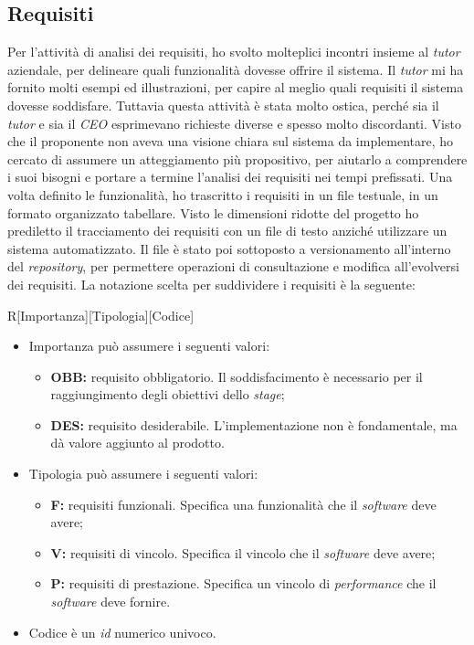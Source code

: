\subsection{Requisiti}
Per l'attività di analisi dei requisiti, ho svolto molteplici incontri insieme al \emph{tutor} aziendale, per delineare quali funzionalità dovesse offrire il sistema. Il \emph{tutor} mi ha fornito molti esempi ed illustrazioni, per capire al meglio quali requisiti il sistema dovesse soddisfare. Tuttavia questa attività è stata molto ostica, perché sia il \emph{tutor} e sia il \emph{CEO} esprimevano richieste diverse e spesso molto discordanti. Visto che il proponente non aveva una visione chiara sul sistema da implementare, ho cercato di assumere un atteggiamento più propositivo, per aiutarlo a comprendere i suoi bisogni e portare a termine l'analisi dei requisiti nei tempi prefissati. Una volta definito le funzionalità, ho trascritto i requisiti in un file testuale, in un formato organizzato tabellare. Visto le dimensioni ridotte del progetto ho prediletto il tracciamento dei requisiti con un file di testo anziché utilizzare un sistema automatizzato. Il file è stato poi sottoposto a versionamento all'interno del \emph{repository}, per permettere operazioni di consultazione e modifica all'evolversi dei requisiti. La notazione scelta per suddividere i requisiti è la seguente: 
\begin{center}
R[Importanza][Tipologia][Codice]
\end{center}
\newpage
\begin{itemize}
\item Importanza può assumere i seguenti valori:
\begin{itemize}
\item \textbf{OBB:} requisito obbligatorio. Il soddisfacimento è necessario per il raggiungimento degli obiettivi dello \emph{stage};
\item \textbf{DES:} requisito desiderabile. L'implementazione non è fondamentale, ma dà valore aggiunto al prodotto.
\end{itemize}
\item Tipologia può assumere i seguenti valori:
\begin{itemize}
\item \textbf{F:} requisiti funzionali. Specifica una funzionalità che il \emph{software} deve avere;
\item \textbf{V:} requisiti di vincolo. Specifica il vincolo che il \emph{software} deve avere;
\item \textbf{P:} requisiti di prestazione. Specifica un vincolo di \emph{performance} che il \emph{software} deve fornire.
\end{itemize}
\item Codice è un \emph{id} numerico univoco.
\end{itemize}
